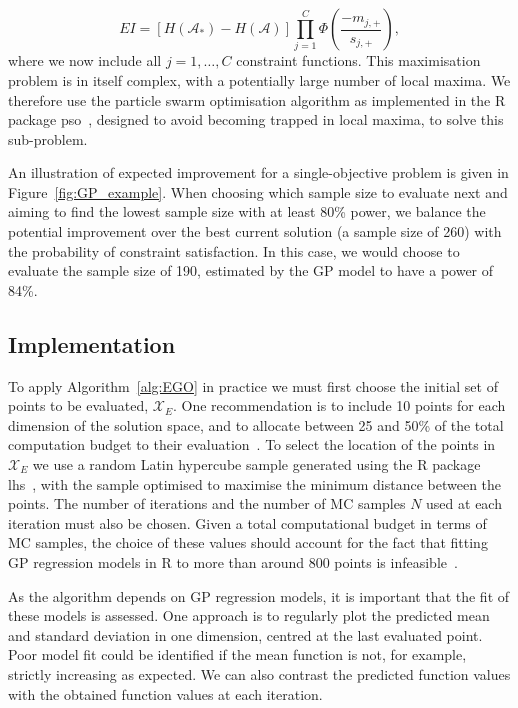 \documentclass{article} %
\begin{document}
\begin{equation}
EI = [H(\mathcal{A}_{*}) - H(\mathcal{A})] \prod_{j=1}^{C} \Phi\left(\frac{-m_{j,+}}{s_{j,+}}\right),
\end{equation}
where we now include all $j = 1, \ldots , C$ constraint functions. This maximisation problem is in itself complex, with a potentially large number of local maxima. We therefore use the particle swarm optimisation algorithm as implemented in the R package pso~\cite{Bendtsen2012}, designed to avoid becoming trapped in local maxima, to solve this sub-problem.

An illustration of expected improvement for a single-objective problem is given in Figure~\ref{fig:GP_example}. When choosing which sample size to evaluate next and aiming to find the lowest sample size with at least 80\% power, we balance the potential improvement over the best current solution (a sample size of 260) with the probability of constraint satisfaction. In this case, we would choose to evaluate the sample size of 190, estimated by the GP model to have a power of 84\%.

\subsection{Implementation}

To apply Algorithm~\ref{alg:EGO} in practice we must first choose the initial set of points to be evaluated, $\mathcal{X}_{E}$. One recommendation is to include 10 points for each dimension of the solution space, and to allocate between 25 and 50\% of the total computation budget to their evaluation~\cite{}. To select the location of the points in $\mathcal{X}_{E}$ we use a random Latin hypercube sample generated using the R package lhs~\cite{Carnell2016}, with the sample optimised to maximise the minimum distance between the points. The number of iterations and the number of MC samples $N$ used at each iteration must also be chosen. Given a total computational budget in terms of MC samples, the choice of these values should account for the fact that fitting GP regression models in R to more than around 800 points is infeasible~\cite{Chevalier2014}. 

As the algorithm depends on GP regression models, it is important that the fit of these models is assessed. One approach is to regularly plot the predicted mean and standard deviation in one dimension, centred at the last evaluated point. Poor model fit could be identified if the mean function is not, for example, strictly increasing as expected. We can also contrast the predicted function values with the obtained function values at each iteration.
\end{document}
